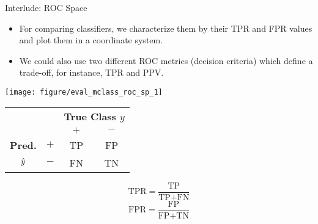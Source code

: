 \documentclass[11pt,compress,t,notes=noshow, xcolor=table]{beamer}
\begin{document}
\begin{vbframe}{Interlude: ROC Space}
	
	\begin{itemize}
		\item For comparing classifiers, we characterize them by their TPR and FPR values and plot them in 
		a coordinate system.
		\item We could also use two different ROC metrics (decision criteria) which define a trade-off, 
		for instance, TPR and PPV.
	\end{itemize}
	
	\lz
	
	\begin{minipage}[c]{0.5\textwidth}
		\begin{knitrout}
			\scriptsize
			\color{fgcolor}
			{\centering \texttt{[image: figure/eval\_mclass\_roc\_sp\_1]}}
		\end{knitrout}
	\end{minipage}%
	\begin{minipage}[c]{0.5\textwidth}
		\begin{center}
			\small
			\begin{tabular}{cc|cc}
				& & \multicolumn{2}{c}{\bfseries True Class $y$} \\
				& & $+$ & $-$ \\
				\hline
				\bfseries Pred.     & $+$ & TP & FP \\
				$\hat{y}$ & $-$ & FN & TN \\
			\end{tabular}
			\lz
			$$\text{TPR} = \frac{\text{TP}}{\text{TP} + \text{FN}}$$
			$$\text{FPR} = \frac{\text{FP}}{\text{FP} + \text{TN}}$$
		\end{center}
	\end{minipage}
	
\end{vbframe}
\end{document}
